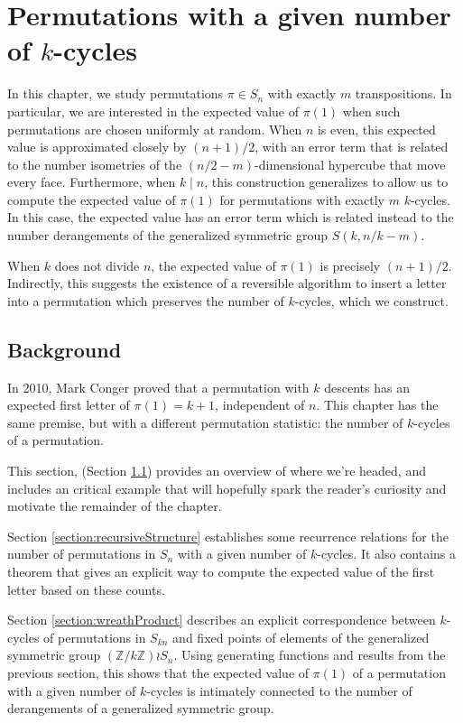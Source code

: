 \chapter{Permutations with a given number of \texorpdfstring{$k$}{k}-cycles}
\label{cha:PermutationStatistics}

In this chapter, we study permutations $\pi \in S_n$ with exactly $m$ transpositions.
In particular, we are interested in the expected value of $\pi(1)$ when such
permutations are chosen uniformly at random. When $n$ is even, this expected value
is approximated closely by $(n+1)/2$, with an error term that is related to the number isometries
of the $(n/2-m)$-dimensional hypercube that move every face.
Furthermore, when $k \mid n$, this construction generalizes to allow us to compute
the expected value of $\pi(1)$ for permutations
with exactly $m$ $k$-cycles. In this case, the expected value has an
error term which is related instead to the number derangements of the
generalized symmetric group $S(k,n/k-m)$.

When $k$ does not divide $n$, the expected value of $\pi(1)$ is precisely
$(n+1)/2$.
Indirectly, this suggests the existence of a reversible algorithm
to insert a letter into a permutation which preserves the number of $k$-cycles,
which we construct.

\section{Background}
\label{section:background}

In 2010, Mark Conger \cite{conger} proved that a permutation
with $k$ descents has an expected first letter of $\pi(1) = k + 1$,
independent of $n$.
This chapter has the same premise, but with a different permutation statistic:
the number of $k$-cycles of a permutation.

This section, (Section \ref{section:background}) provides an overview of where
we're headed, and includes an critical example that will hopefully spark the
reader's curiosity and motivate the remainder of the chapter.

Section \ref{section:recursiveStructure} establishes some recurrence relations for
the number of permutations in $S_n$ with a given number of $k$-cycles.
It also contains a theorem that gives an explicit way to compute the expected
value of the first letter based on these counts.

Section \ref{section:wreathProduct} describes an explicit correspondence
between $k$-cycles of permutations in $S_{kn}$ and fixed points of elements of the generalized
symmetric group $(\mathbb{Z}/k\mathbb{Z}) \wr S_n$. Using generating functions and results
from the previous section, this shows that the expected value of $\pi(1)$ of a
permutation with a given number of $k$-cycles is intimately connected to the
number of derangements of a generalized symmetric group.

